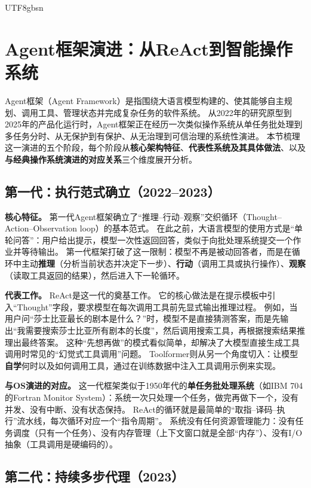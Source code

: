 \documentclass[11pt,a4paper]{article}
\begin{document}
\begin{CJK*}{UTF8}{gbsn}
\section{Agent框架演进：从ReAct到智能操作系统}
\label{sec:agentevolution}

Agent框架（Agent Framework）是指围绕大语言模型构建的、使其能够自主规划、调用工具、管理状态并完成复杂任务的软件系统。
从2022年的研究原型到2025年的产品化运行时，Agent框架正在经历一次类似操作系统从单任务批处理到多任务分时、从无保护到有保护、从无治理到可信治理的系统性演进。
本节梳理这一演进的五个阶段，每个阶段从\textbf{核心架构特征}、\textbf{代表性系统及其具体做法}、以及\textbf{与经典操作系统演进的对应关系}三个维度展开分析。

\subsection*{第一代：执行范式确立（2022--2023）}

\textbf{核心特征。}
第一代Agent框架确立了``推理--行动--观察''交织循环（Thought--Action--Observation loop）的基本范式。
在此之前，大语言模型的使用方式是``单轮问答''：用户给出提示，模型一次性返回回答，类似于向批处理系统提交一个作业并等待输出。
第一代框架打破了这一限制：模型不再是被动回答者，而是在循环中主动\textbf{推理}（分析当前状态并决定下一步）、\textbf{行动}（调用工具或执行操作）、\textbf{观察}（读取工具返回的结果），然后进入下一轮循环。

\textbf{代表工作。}
ReAct\cite{yao2023react}是这一代的奠基工作。
它的核心做法是在提示模板中引入``Thought''字段，要求模型在每次调用工具前先显式输出推理过程。
例如，当用户问``莎士比亚最长的剧本是什么？''时，模型不是直接猜测答案，而是先输出``我需要搜索莎士比亚所有剧本的长度''，然后调用搜索工具，再根据搜索结果推理出最终答案。
这种``先想再做''的模式看似简单，却解决了大模型直接生成工具调用时常见的``幻觉式工具调用''问题。
Toolformer\cite{schick2023toolformer}则从另一个角度切入：让模型\textbf{自学}何时以及如何调用工具，通过在训练数据中注入工具调用示例来实现。

\textbf{与OS演进的对应。}
这一代框架类似于1950年代的\textbf{单任务批处理系统}（如IBM 704的Fortran Monitor System）：系统一次只处理一个任务，做完再做下一个，没有并发、没有中断、没有状态保持。
ReAct的循环就是最简单的``取指--译码--执行''流水线，每次循环对应一个``指令周期''。
系统没有任何资源管理能力：没有任务调度（只有一个任务）、没有内存管理（上下文窗口就是全部``内存''）、没有I/O抽象（工具调用是硬编码的）。

\subsection*{第二代：持续多步代理（2023）}


\end{CJK*}
\end{document}
